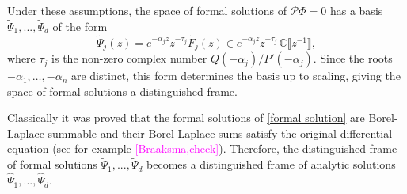 \documentclass{article}
\theoremstyle{definition}
\newcommand{\C}{\mathbb{C}}
\newcommand{\series}[1]{\tilde{#1}}
\theoremstyle{plain}
\begin{document}
Under these assumptions, the space of formal solutions of $\mathcal{P}\Phi = 0$ has a basis $\series{\Psi}_1,...,\series{\Psi}_d$ of the form~\cite{int-irreg}\cite[Proposition~2.2.7, p.~111]{EcalleIII}
\begin{equation}\label{formal solution}
\series{\Psi}_j(z)=e^{-\alpha_j z}z^{-\tau_j}\series{F}_j(z)\in e^{-\alpha_j z } z^{-\tau_j}\,\C \llbracket z^{-1} \rrbracket,
\end{equation}
where $\tau_j$ is the non-zero complex number $Q(-\alpha_j)/P'(-\alpha_j)$. Since the roots $-\alpha_1, \ldots, -\alpha_n$ are distinct, this form determines the basis up to scaling, giving the space of formal solutions a distinguished frame.

Classically it was proved that the formal solutions of \eqref{formal solution} are Borel-Laplace summable and their Borel-Laplace sums satisfy the original differential equation (see for example \cite{ramis1991series,malgrange92,malgrange1995sommation,diverg-resurg--ii}\textcolor{magenta}{[Braaksma,check]}). Therefore, the distinguished frame of formal solutions $\series{\Psi}_1,...,\series{\Psi}_d$ becomes a distinguished frame of analytic solutions $\hat{\Psi}_1,...,\hat{\Psi}_d$.       
\end{document}
